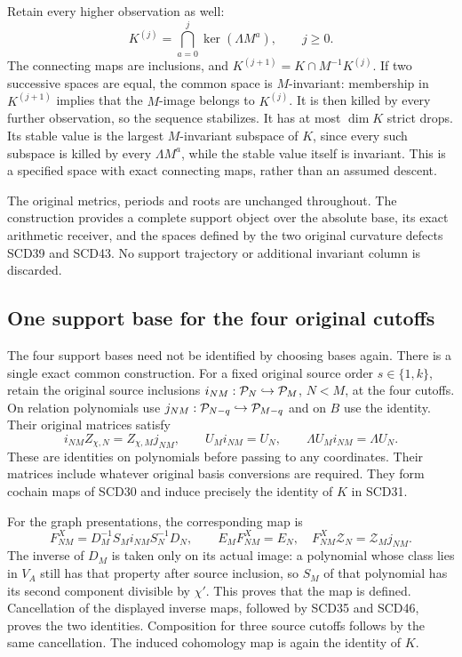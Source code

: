 Retain every higher observation as well:
\[
 K^{(j)}=\bigcap_{a=0}^{j}\ker(\Lambda M^a),\qquad j\ge0.
 \tag{SCD45}
\]
The connecting maps are inclusions, and
\(K^{(j+1)}=K\cap M^{-1}K^{(j)}\). If two successive spaces
are equal, the common space is \(M\)-invariant: membership in
\(K^{(j+1)}\) implies that the \(M\)-image belongs to \(K^{(j)}\).
It is then killed by every further observation, so the sequence
stabilizes. It has at most \(\dim K\) strict drops. Its stable
value is the largest \(M\)-invariant subspace of \(K\), since
every such subspace is killed by every \(\Lambda M^a\), while
the stable value itself is invariant. This is a specified space
with exact connecting maps, rather than an assumed descent.

The original metrics, periods and roots are unchanged throughout.
The construction provides a complete support object over the
absolute base, its exact arithmetic receiver, and the spaces
defined by the two original curvature defects SCD39 and SCD43.
No support trajectory or additional invariant column is discarded.

\subsection{One support base for the four original cutoffs}

The four support bases need not be identified by choosing bases again.
There is a single exact common construction. For a fixed original source
order \(s\in\{1,k\}\), retain the original source inclusions
\(i_{NM}:\mathcal P_N\hookrightarrow\mathcal P_M\), \(N<M\), at the four cutoffs.
On relation polynomials use \(j_{NM}:\mathcal P_{N-q}\hookrightarrow\mathcal P_{M-q}\)
and on \(B\) use the identity. Their original matrices satisfy
\[
 i_{NM}Z_{\chi,N}=Z_{\chi,M}j_{NM},\qquad
 U_Mi_{NM}=U_N,\qquad
 \Lambda U_Mi_{NM}=\Lambda U_N .
 \tag{SCD46}
\]
These are identities on polynomials before passing to any coordinates.
Their matrices include whatever original basis conversions are required.
They form cochain maps of SCD30 and induce precisely the identity of
\(K\) in SCD31.

For the graph presentations, the corresponding map is
\[
 F^X_{NM}=D_M^{-1}S_Mi_{NM}S_N^{-1}D_N,\qquad
 E_MF^X_{NM}=E_N,\quad
 F^X_{NM}\mathcal Z_N=\mathcal Z_Mj_{NM}.
 \tag{SCD47}
\]
The inverse of \(D_M\) is taken only on its actual image: a polynomial
whose class lies in \(V_A\) still has that property after source inclusion,
so \(S_M\) of that polynomial has its second component divisible by
\(\chi'\). This proves that the map is defined. Cancellation of the
displayed inverse maps, followed by SCD35 and SCD46, proves the two
identities. Composition for three source cutoffs follows by the same
cancellation. The induced cohomology map is again the identity of \(K\).

